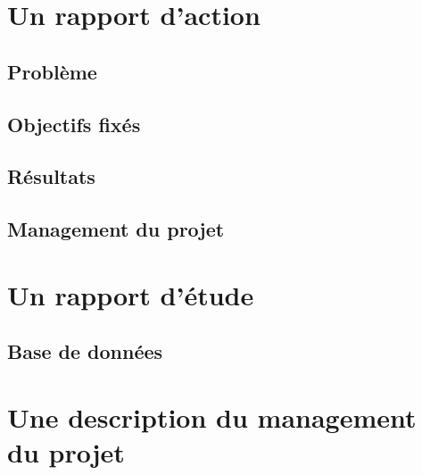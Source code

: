\documentclass[11pt]{article}
\begin{document}
\tableofcontents
\newpage 

\justify


\section{Un rapport d'action}

	\subsection{Problème}
	\subsection{Objectifs fixés}
	\subsection{Résultats}
	\subsection{Management du projet}

\section{Un rapport d'étude}
	\subsection{Base de données}


\section{Une description du management du projet}
\end{document}
